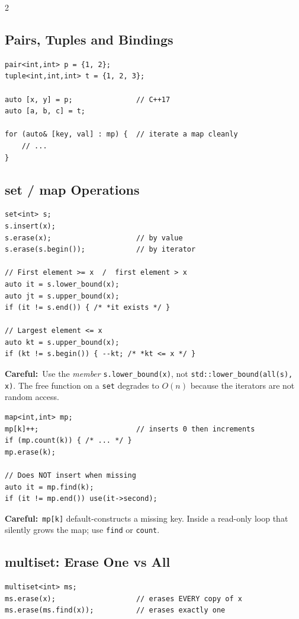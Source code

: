 \documentclass[10pt]{article}
\newcommand{\code}[1]{\texttt{\small #1}}
\newcommand{\warn}[1]{{\color{warnc}\footnotesize\textbf{Careful:}}~{\footnotesize #1}\par}
\begin{document}
\begin{multicols}{2}
\subsection{Pairs, Tuples and Bindings}
\begin{lstlisting}
pair<int,int> p = {1, 2};
tuple<int,int,int> t = {1, 2, 3};

auto [x, y] = p;               // C++17
auto [a, b, c] = t;

for (auto& [key, val] : mp) {  // iterate a map cleanly
    // ...
}
\end{lstlisting}

\subsection{set / map Operations}
\begin{lstlisting}
set<int> s;
s.insert(x);
s.erase(x);                    // by value
s.erase(s.begin());            // by iterator

// First element >= x  /  first element > x
auto it = s.lower_bound(x);
auto jt = s.upper_bound(x);
if (it != s.end()) { /* *it exists */ }

// Largest element <= x
auto kt = s.upper_bound(x);
if (kt != s.begin()) { --kt; /* *kt <= x */ }
\end{lstlisting}
\warn{Use the \emph{member} \code{s.lower\_bound(x)}, not
\code{std::lower\_bound(all(s), x)}. The free function on a \code{set}
degrades to $O(n)$ because the iterators are not random access.}

\begin{lstlisting}
map<int,int> mp;
mp[k]++;                       // inserts 0 then increments
if (mp.count(k)) { /* ... */ }
mp.erase(k);

// Does NOT insert when missing
auto it = mp.find(k);
if (it != mp.end()) use(it->second);
\end{lstlisting}
\warn{\code{mp[k]} default-constructs a missing key. Inside a read-only
loop that silently grows the map; use \code{find} or \code{count}.}

\subsection{multiset: Erase One vs All}
\begin{lstlisting}
multiset<int> ms;
ms.erase(x);                   // erases EVERY copy of x
ms.erase(ms.find(x));          // erases exactly one
\end{lstlisting}


\end{multicols}
\end{document}
